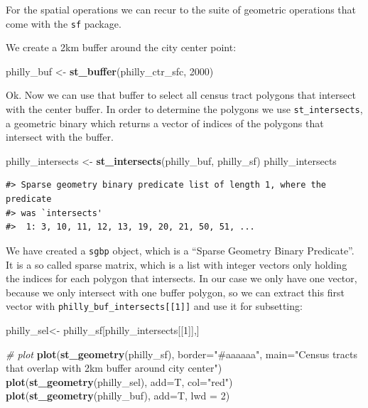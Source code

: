 \documentclass[
]{book}
\newenvironment{Shaded}{\begin{snugshade}}{\end{snugshade}}
\newcommand{\AttributeTok}[1]{\textcolor[rgb]{0.13,0.29,0.53}{#1}}
\newcommand{\CommentTok}[1]{\textcolor[rgb]{0.56,0.35,0.01}{\textit{#1}}}
\newcommand{\DecValTok}[1]{\textcolor[rgb]{0.00,0.00,0.81}{#1}}
\newcommand{\FunctionTok}[1]{\textcolor[rgb]{0.13,0.29,0.53}{\textbf{#1}}}
\newcommand{\NormalTok}[1]{#1}
\newcommand{\OtherTok}[1]{\textcolor[rgb]{0.56,0.35,0.01}{#1}}
\newcommand{\StringTok}[1]{\textcolor[rgb]{0.31,0.60,0.02}{#1}}
\begin{document}
For the spatial operations we can recur to the suite of geometric operations that come with the \texttt{sf} package.

We create a 2km buffer around the city center point:

\begin{Shaded}
\begin{Highlighting}[]
\NormalTok{philly\_buf }\OtherTok{\textless{}{-}} \FunctionTok{st\_buffer}\NormalTok{(philly\_ctr\_sfc, }\DecValTok{2000}\NormalTok{)}
\end{Highlighting}
\end{Shaded}

Ok. Now we can use that buffer to select all census tract polygons that intersect with the center buffer. In order to determine the polygons we use \texttt{st\_intersects}, a geometric binary which returns a vector of indices of the polygons that intersect with the buffer.

\begin{Shaded}
\begin{Highlighting}[]
\NormalTok{philly\_intersects }\OtherTok{\textless{}{-}} \FunctionTok{st\_intersects}\NormalTok{(philly\_buf, philly\_sf)}
\NormalTok{philly\_intersects}
\end{Highlighting}
\end{Shaded}

\begin{verbatim}
#> Sparse geometry binary predicate list of length 1, where the predicate
#> was `intersects'
#>  1: 3, 10, 11, 12, 13, 19, 20, 21, 50, 51, ...
\end{verbatim}

We have created a \texttt{sgbp} object, which is a ``Sparse Geometry Binary Predicate''. It is a so called sparse matrix, which is a list with integer vectors only holding the indices for each polygon that intersects. In our case we only have one vector, because we only intersect with one buffer polygon, so we can extract this first vector with \texttt{philly\_buf\_intersects{[}{[}1{]}{]}} and use it for subsetting:

\begin{Shaded}
\begin{Highlighting}[]
\NormalTok{philly\_sel}\OtherTok{\textless{}{-}}\NormalTok{ philly\_sf[philly\_intersects[[}\DecValTok{1}\NormalTok{]],]}

\CommentTok{\# plot}
\FunctionTok{plot}\NormalTok{(}\FunctionTok{st\_geometry}\NormalTok{(philly\_sf), }\AttributeTok{border=}\StringTok{"\#aaaaaa"}\NormalTok{, }\AttributeTok{main=}\StringTok{"Census tracts that overlap with 2km buffer around city center"}\NormalTok{)}
\FunctionTok{plot}\NormalTok{(}\FunctionTok{st\_geometry}\NormalTok{(philly\_sel), }\AttributeTok{add=}\NormalTok{T, }\AttributeTok{col=}\StringTok{"red"}\NormalTok{)}
\FunctionTok{plot}\NormalTok{(}\FunctionTok{st\_geometry}\NormalTok{(philly\_buf), }\AttributeTok{add=}\NormalTok{T, }\AttributeTok{lwd =} \DecValTok{2}\NormalTok{)}
\end{Highlighting}
\end{Shaded}
\end{document}
